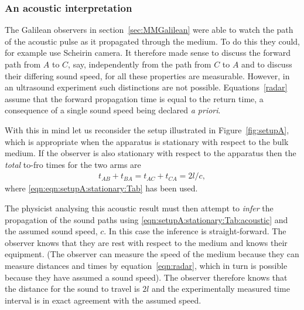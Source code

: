 \documentclass[10pt, fleqn,draft,showtrims,oldfontcommands]{article} %
\newcommand{\secref}[1]{section~\ref{sec:#1}}
\newcommand{\eqnref}[1]{\ref{eqn:#1}}
\newcommand{\figref}[1]{Figure~\ref{fig:#1}}
\begin{document}
\subsubsection{An acoustic interpretation}\label{sec:MMLorenztian}

The Galilean observers in \secref{MMGalilean} were able to watch the path of the acoustic pulse as it propagated through the medium.
To do this they could, for example use Scheirin camera.
It therefore made sense to discuss the forward path from $A$ to $C$, say, independently from the path from $C$ to $A$
and to discuss their differing sound speed, for all these properties are measurable.
However, in an ultrasound experiment such distinctions are not possible.
Equations~\ref{radar} assume that the forward propagation time is equal to the return time,
a consequence of  a single sound speed being declared {\em a priori}.

With this in mind let us reconsider the setup illustrated in \figref{setupA}, 
which is  appropriate when the apparatus is stationary with respect to the bulk medium.
If the observer is also stationary with respect to the apparatus then 
the {\em total} to-fro times for the two arms are %
\begin{align}
   t_{AB}+t_{BA}=t_{AC}+t_{CA}=2l/c, \label{eqn:setupA:stationary:Tab:acoustic}
\end{align}
where \eqnref{eqn:setupA:stationary:Tab} has been used.

The physicist analysing this acoustic result must then attempt to {\em infer}
the propagation of the sound paths using \eqnref{setupA:stationary:Tab:acoustic}
and the assumed  sound speed, $c$.
In this case the inference is straight-forward.
The observer knows that they are rest with respect to the medium and knows their equipment.
(The observer can measure the speed of the medium because they can measure distances and times by equation~\ref{eqn:radar},
which in turn is possible because they have assumed a sound speed).
The observer  therefore knows that the distance for the sound to travel is $2l$
and the experimentally measured time interval is in exact agreement with the assumed speed.



\end{document}
